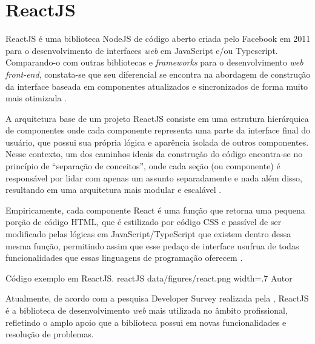 \section{ReactJS}
\label{sec:reactJS}
ReactJS é uma biblioteca NodeJS de código aberto criada pelo Facebook em 2011 para o desenvolvimento de interfaces \textit{web} em JavaScript e/ou Typescript. Comparando-o com outras bibliotecas e \textit{frameworks} para o desenvolvimento \textit{web front-end}, constata-se que seu diferencial se encontra na abordagem de construção da interface baseada em componentes atualizados e sincronizados de forma muito mais otimizada \cite{Source2023}.

A arquitetura base de um projeto ReactJS consiste em uma estrutura hierárquica de componentes onde cada componente representa uma parte da interface final do usuário, que possui sua própria lógica e aparência isolada de outros componentes. Nesse contexto, um dos caminhos ideais da construção do código encontra-se no princípio de “separação de conceitos”, onde cada seção (ou componente) é responsável por lidar com apenas um assunto separadamente e nada além disso, resultando em uma arquitetura mais modular e escalável \cite{Qawwas2022}.

Empiricamente, cada componente React é uma função que retorna uma pequena porção de código HTML, que é estilizado por código CSS e passível de ser modificado pelas lógicas em JavaScript/TypeScript que existem dentro dessa mesma função, permitindo assim que esse pedaço de interface usufrua de todas funcionalidades que essas linguagens de programação oferecem \cite{Qawwas2022}.

\image
    {Código exemplo em ReactJS.}
    {reactJS}
    {data/figures/react.png}
    {width=.7\textwidth}
    {Autor}

Atualmente, de acordo com a pesquisa Developer Survey realizada pela , ReactJS é a biblioteca de desenvolvimento \textit{web} mais utilizada no âmbito profissional, refletindo o amplo apoio que a biblioteca possui em novas funcionalidades e resolução de problemas.